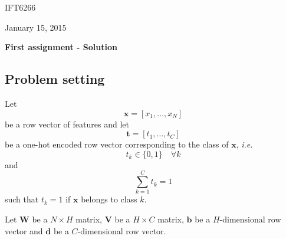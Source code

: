 \documentclass{article}
\def\duedate{January 15, 2015}
\def\class{IFT6266}
\def\title{First assignment - Solution}
\begin{document}
\begin{titlepage}
\begin{center}
\begin{minipage}{0.5\textwidth}
\begin{flushleft} \large
\class
\end{flushleft}
\end{minipage}
\begin{minipage}{0.49\textwidth}
\begin{flushright} \large
\duedate
\end{flushright}
\end{minipage}
\vspace{1cm}
\Large \textbf{\title}
\end{center}
\end{titlepage}


\subsection*{Problem setting}

Let
\begin{equation}
    \mathbf{x} = [x_1, \ldots, x_N]
\end{equation}
be a row vector of features and let
\begin{equation}
    \mathbf{t} = [t_1, \ldots, t_C]
\end{equation}
be a one-hot encoded row vector corresponding to the class of $\mathbf{x}$,
\emph{i.e.}
\begin{equation}
t_k \in \{0, 1\} \quad \forall k
\end{equation}
and
\begin{equation}
    \sum_{k=1}^C t_k = 1
\end{equation}
such that $t_k = 1$ if $\mathbf{x}$ belongs to class $k$.

Let $\mathbf{W}$ be a $N \times H$ matrix, $\mathbf{V}$ be a $H \times C$
matrix, $\mathbf{b}$ be a $H$-dimensional row vector and $\mathbf{d}$ be a
$C$-dimensional row vector.
\end{document}
